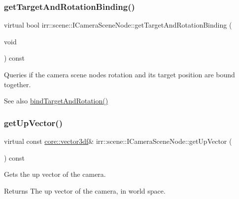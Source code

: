 \subsubsection{\texorpdfstring{get\+Target\+And\+Rotation\+Binding()}{getTargetAndRotationBinding()}}
{\footnotesize\ttfamily virtual bool irr\+::scene\+::\+I\+Camera\+Scene\+Node\+::get\+Target\+And\+Rotation\+Binding (\begin{DoxyParamCaption}\item[{void}]{ }\end{DoxyParamCaption}) const\hspace{0.3cm}{\ttfamily [pure virtual]}}



Queries if the camera scene node\textquotesingle{}s rotation and its target position are bound together. 

\begin{DoxySeeAlso}{See also}
\hyperlink{classirr_1_1scene_1_1ICameraSceneNode_ad8785d7b2f730933a8d4425ac54e7205}{bind\+Target\+And\+Rotation()} 
\end{DoxySeeAlso}
\mbox{\label{classirr_1_1scene_1_1ICameraSceneNode_a0dfb97859302021b9a44f2ead59fa230}} 
\subsubsection{\texorpdfstring{get\+Up\+Vector()}{getUpVector()}}
{\footnotesize\ttfamily virtual const \hyperlink{namespaceirr_1_1core_a06f169d08b5c429f5575acb7edbad811}{core\+::vector3df}\& irr\+::scene\+::\+I\+Camera\+Scene\+Node\+::get\+Up\+Vector (\begin{DoxyParamCaption}{ }\end{DoxyParamCaption}) const\hspace{0.3cm}{\ttfamily [pure virtual]}}



Gets the up vector of the camera. 

\begin{DoxyReturn}{Returns}
The up vector of the camera, in world space. 
\end{DoxyReturn}
\mbox{\label{classirr_1_1scene_1_1ICameraSceneNode_add0cba097d3e59714546f04f2c53477e}} 
